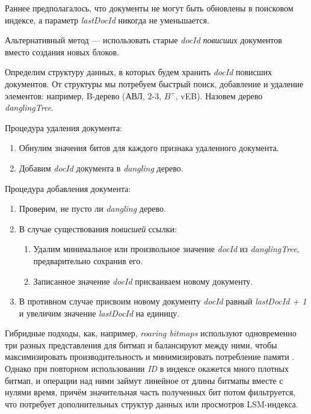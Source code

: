 Раннее предполагалось, что документы не могут быть обновлены в поисковом
индексе, а параметр \textit{lastDocId} никогда не уменьшается.

Альтернативный метод — использовать старые \textit{docId} \textit{повисших}
документов вместо создания новых блоков.

Определим структуру данных, в которых будем хранить \textit{docId} повисших
документов. От структуры мы потребуем быстрый поиск, добавление и удаление
элементов: например, B-дерево (АВЛ, 2-3, $B^{+}$, vEB).
Назовем дерево \textit{danglingTree}.

Процедура удаления документа:
\begin{enumerate}
    \item Обнулим значения битов для каждого признака удаленного документа.
    \item Добавим \textit{docId} документа в \textit{dangling} дерево.
\end{enumerate}

Процедура добавления документа:
\begin{enumerate}
    \item Проверим, не пусто ли \textit{dangling} дерево.
    \item В случае существования \textit{повисшей} ссылки:
    \begin{enumerate}
        \item Удалим минимальное или произвольное значение \textit{docId} из
        \textit{danglingTree}, предварительно сохранив его.
        \item Записанное значение \textit{docId} присваиваем новому документу.
    \end{enumerate}
    \item В противном случае присвоим новому документу \textit{docId} равный
    \textit{lastDocId + 1} и увеличим значение \textit{lastDocId} на единицу.
\end{enumerate}

Гибридные подходы, как, например, \textit{roaring bitmaps} используют одновременно
три разных представления для битмап и балансируют между ними, чтобы
максимизировать производительность и минимизировать потребление памяти \cite{Roaring:2019}.
Однако при повторном использовании \textit{ID} в индексе окажется много плотных
битмап, и операции над ними займут линейное от длины битмапы вместе с нулями
время, причём значительная часть полученных бит потом фильтруется, что потребует
дополнительных структур данных или просмотров LSM-индекса.

